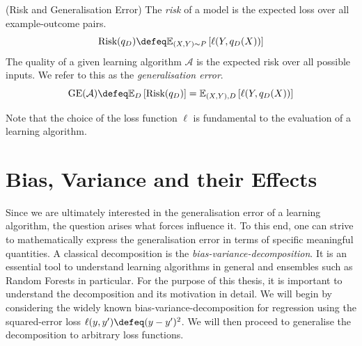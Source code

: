 \documentclass[
	twoside=false, %
]{kaobook}
\begin{document}
\begin{definition} (Risk and Generalisation Error)
The \textit{risk} of a model is the expected loss over all example-outcome pairs.
$$
\text{Risk}(q_{D}) \defeq \mathbb{E}_{(X,Y)\sim P}\left[ \ell(Y, q_{D}(X)) \right] 
$$
%
The quality of a given learning algorithm $\mathcal{A}$ is the expected risk over all possible inputs. We refer to this as the \textit{generalisation error}. 
$$
\text{GE}(\mathcal{A}) \defeq \mathbb{E}_{D}\left[ \text{Risk}(q_{D}) \right]  = \mathbb{E}_{(X,Y), D}\left[ \ell(Y, q_{D}(X)) \right] 
$$
\end{definition}
Note that the choice of the loss function $\ell$ is fundamental to the evaluation of a learning algorithm.

\section{Bias, Variance and their Effects}
 \label{sec:bias-variance-effects}

Since we are ultimately interested in the generalisation error of a learning algorithm, the question arises what forces influence it. To this end, one can strive to mathematically express the generalisation error in terms of specific meaningful quantities. A classical decomposition is the \textit{bias-variance-decomposition}. 
It is an essential tool to understand learning algorithms in general and ensembles such as Random Forests in particular. For the purpose of this thesis, it is important to understand the decomposition and its motivation in detail. 
We will begin by considering the widely known bias-variance-decomposition for regression using the squared-error loss $\ell(y, y') \defeq (y- y')^2$. We will then proceed to generalise the decomposition to arbitrary loss functions.
\end{document}
